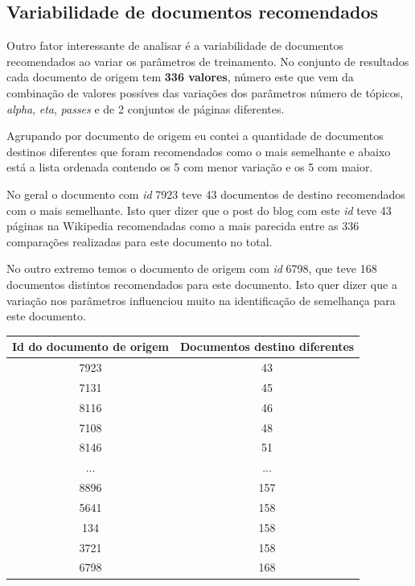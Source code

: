 \subsection{Variabilidade de documentos recomendados}

Outro fator interessante de analisar é a variabilidade de documentos recomendados ao variar os parâmetros de treinamento. No conjunto de resultados cada documento 
de origem tem \textbf{336 valores}, número este que vem da combinação de valores possíves das variações dos parâmetros número de tópicos,
\textit{alpha}, \textit{eta}, \textit{passes} e de 2 conjuntos de páginas diferentes.

Agrupando por documento de origem eu contei a quantidade de documentos destinos diferentes que foram recomendados como o mais semelhante e abaixo
está a lista ordenada contendo os 5 com menor variação e os 5 com maior.

No geral o documento com \textit{id} 7923 teve 43 documentos de destino recomendados com o mais semelhante. Isto quer dizer que o post do blog com 
este \textit{id} teve 43 páginas na Wikipedia recomendadas como a mais parecida entre as 336 comparações realizadas para este documento no total.

No outro extremo temos o documento de origem com \textit{id} 6798, que teve 168 documentos distintos recomendados para este documento. Isto
quer dizer que a variação nos parâmetros influenciou muito na identificação de semelhança para este documento.

\begin{center}
    \begin{tabular}{|c|c|}
        \hline
        \textbf{Id do documento de origem} & \textbf{Documentos destino diferentes} \\
        \hline
        7923 & 43 \\
        \hline
        7131 & 45 \\
        \hline
        8116 & 46 \\
        \hline
        7108 & 48 \\
        \hline
        8146 & 51 \\
        \hline
        ... & ... \\
        \hline
        8896 & 157 \\
        \hline
        5641 & 158 \\
        \hline
        134 & 158 \\
        \hline
        3721 & 158 \\
        \hline
        6798 & 168 \\
        \hline
    \end{tabular}
\end{center}

